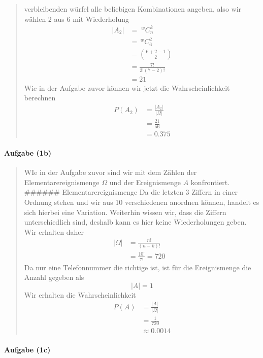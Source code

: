 \documentclass[
]{article}
\begin{document}
\begin{quote}
verbleibenden würfel alle beliebigen Kombinationen angeben, also wir
wählen 2 aus 6 mit Wiederholung \[\begin{align}
\lvert A_{2} \rvert &= \;^wC^k_{n}  \\
       &= \,^wC^2_{6} \\
       &= \binom{6+2-1}{2} \\
    &= \frac{7!}{2!(7-2)!} \\
    &= 21
\end{align}\] Wie in der Aufgabe zuvor können wir jetzt die
Wahrscheinlichkeit berechnen \[\begin{align}
P(A_{2}) &= \frac{\lvert A_{2} \rvert}{\lvert \Omega \rvert } \\
     &= \frac{21}{56}\\
    &=0.375
\end{align}\]
\end{quote}

\paragraph{Aufgabe (1b)}\label{aufgabe-1b}

\begin{quote}
WIe in der Aufgabe zuvor sind wir mit dem Zählen der
Elementarereignismenge \(\Omega\) und der Ereignismenge \(A\)
konfrontiert. \#\#\#\#\#\# Elementarereignismenge Da die letzten 3
Ziffern in einer Ordnung stehen und wir aus 10 verschiedenen anordnen
können, handelt es sich hierbei eine Variation. Weiterhin wissen wir,
dass die Ziffern unterschiedlich sind, deshalb kann es hier keine
Wiederholungen geben. Wir erhalten daher \[\begin{align}
\lvert \Omega \rvert &= \frac{n!}{(n-k)!} & \\
      &= \frac{10!}{7!} = 720
\end{align}\] Da nur eine Telefonnummer die richtige ist, ist für die
Ereignismenge die Anzahl gegeben als \[\lvert A \rvert = 1 \] Wir
erhalten die Wahrscheinlichkeit \[\begin{align}
P(A) &= \frac{\lvert A \rvert}{\lvert \Omega \rvert }  \\
&= \frac{1}{720} \\
&\approx 0.0014
\end{align}\]
\end{quote}

\paragraph{Aufgabe (1c)}\label{aufgabe-1c}
\end{document}
